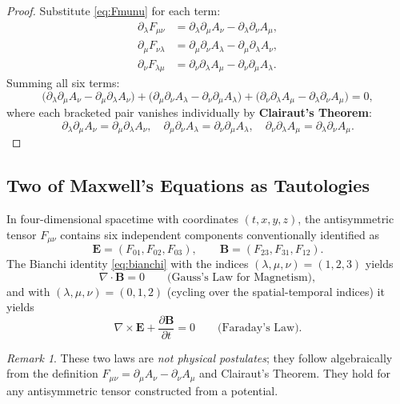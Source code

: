 \documentclass[12pt, a4paper]{article}
\theoremstyle{plain}
\theoremstyle{definition}
\theoremstyle{remark}
\newtheorem{remark}[theorem]{Remark}
\begin{document}
\begin{proof}
Substitute \eqref{eq:Fmunu} for each term:
\begin{align*}
  \partial_\lambda F_{\mu\nu}
    &= \partial_\lambda\partial_\mu A_\nu - \partial_\lambda\partial_\nu A_\mu, \\
  \partial_\mu F_{\nu\lambda}
    &= \partial_\mu\partial_\nu A_\lambda - \partial_\mu\partial_\lambda A_\nu, \\
  \partial_\nu F_{\lambda\mu}
    &= \partial_\nu\partial_\lambda A_\mu - \partial_\nu\partial_\mu A_\lambda.
\end{align*}
Summing all six terms:
\[
  \bigl(\partial_\lambda\partial_\mu A_\nu - \partial_\mu\partial_\lambda A_\nu\bigr)
  +\bigl(\partial_\mu\partial_\nu A_\lambda - \partial_\nu\partial_\mu A_\lambda\bigr)
  +\bigl(\partial_\nu\partial_\lambda A_\mu - \partial_\lambda\partial_\nu A_\mu\bigr)
  = 0,
\]
where each bracketed pair vanishes individually by \textbf{Clairaut's Theorem}:
\[
  \partial_\lambda\partial_\mu A_\nu = \partial_\mu\partial_\lambda A_\nu, \quad
  \partial_\mu\partial_\nu A_\lambda = \partial_\nu\partial_\mu A_\lambda, \quad
  \partial_\nu\partial_\lambda A_\mu = \partial_\lambda\partial_\nu A_\mu.
\]
\end{proof}

\subsection{Two of Maxwell's Equations as Tautologies}

In four-dimensional spacetime with coordinates $(t,x,y,z)$, the antisymmetric tensor $F_{\mu\nu}$ contains six independent components conventionally identified as
\[
  \mathbf{E} = (F_{01}, F_{02}, F_{03}), \qquad
  \mathbf{B} = (F_{23}, F_{31}, F_{12}).
\]
The Bianchi identity \eqref{eq:bianchi} with the indices $(\lambda,\mu,\nu) = (1,2,3)$ yields
\[
  \nabla \cdot \mathbf{B} = 0 \qquad \text{(Gauss's Law for Magnetism)},
\]
and with $(\lambda,\mu,\nu) = (0,1,2)$ (cycling over the spatial-temporal indices) it yields
\[
  \nabla \times \mathbf{E} + \frac{\partial \mathbf{B}}{\partial t} = 0 \qquad \text{(Faraday's Law)}.
\]

\begin{remark}
These two laws are \emph{not physical postulates}; they follow algebraically from the definition $F_{\mu\nu} = \partial_\mu A_\nu - \partial_\nu A_\mu$ and Clairaut's Theorem.  They hold for any antisymmetric tensor constructed from a potential.
\end{remark}
\end{document}
